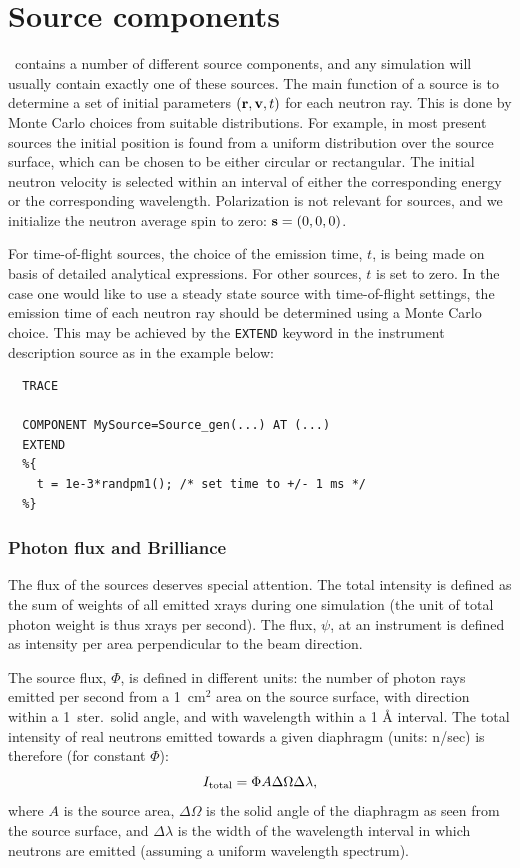 
\chapter{Source components}
\label{c:source}

\MCX\ contains a number of different source components,
and any simulation will usually contain exactly one of these sources.
The main function of a source is to determine a set of initial
parameters $({\bf r}, {\bf v}, t)$
for each neutron ray. This is done by Monte Carlo choices from
suitable distributions. For example, in most present sources
the initial position is
found from a uniform distribution over the source surface,
which can be chosen to be either circular or rectangular.
The initial neutron velocity is selected within an interval
of either the corresponding energy or the corresponding wavelength.
Polarization is not relevant for sources,
and we initialize the neutron average spin to zero: ${\bf s}=(0,0,0)$.

For time-of-flight sources, the choice of the emission time, $t$,
is being made on basis of detailed analytical expressions.
For other sources, $t$ is set to zero.
In the case one would like to use a steady state source
with time-of-flight settings,
the emission time of each neutron ray should be determined using
a Monte Carlo choice. This may be achieved by
the \verb+EXTEND+ keyword in the instrument description source
as in the example below:

\begin{verbatim}
  TRACE

  COMPONENT MySource=Source_gen(...) AT (...)
  EXTEND
  %{
    t = 1e-3*randpm1(); /* set time to +/- 1 ms */
  %}
\end{verbatim}

\subsection{Photon flux and Brilliance}
\label{s:xray-flux}
The flux of the sources deserves special attention. The total
intensity is defined as the sum of weights of all emitted xrays
during one simulation
(the unit of total photon weight is thus xrays per second).
The flux, $\psi$, at an instrument is defined as intensity per area perpendicular
to the beam direction.

The source flux, $\Phi$, is defined in different units:
the number of photon rays emitted per second from a
1~cm$^2$ area on the source surface,
with direction within a 1~ster.\ solid angle,
and with wavelength within a 1 {\AA} interval.
The total intensity of real neutrons emitted towards a given diaphragm
(units: n/sec) is therefore (for constant $\Phi$):
\begin{equation}
I_{\rm total} = \Phi A \Delta\Omega \Delta\lambda ,
\end{equation}
where $A$ is the source area, $\Delta\Omega$ is the solid angle of the
diaphragm as seen from the source surface, and $\Delta\lambda$ is the
width of the wavelength interval in which neutrons are emitted (assuming
a uniform wavelength spectrum).

